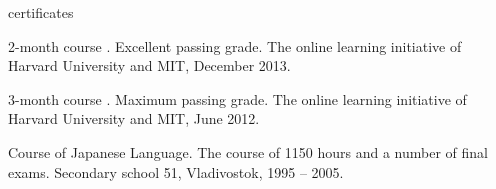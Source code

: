 \documentclass{template}
\begin{document}

\begin{rSection}{certificates}
\begin{rItemize}

\item 2-month course \href{http://www.vova-ivanov.info/6.00.1x-Certificate.pdf}
      {}. Excellent passing grade. \newline
      The online learning initiative of Harvard University and MIT, December 2013.
\item 3-month course \href{http://www.vova-ivanov.info/6.002x-Certificate.pdf}
      {}. Maximum passing grade. \newline
      The online learning initiative of Harvard University and MIT, June 2012.
\item Course of Japanese Language. The course of 1150 hours and a number of final exams. \newline
      Secondary school 51, Vladivostok, 1995 -- 2005.

\end{rItemize}
\end{rSection}

\end{document}
